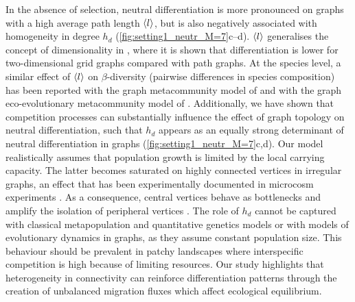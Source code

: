   In the absence of selection, neutral differentiation is more pronounced on graphs with a high average path length $\langle l \rangle$, but is also negatively associated with homogeneity in degree $h_d$ (\cref{fig:setting1_neutr_M=7}c--d).
  $\langle l \rangle$ generalises the concept of dimensionality in \cite{Kimura1964,Lande1991,Nagylaki1994}, where it is shown that differentiation is lower for two-dimensional grid graphs compared with path graphs. At the species level, a similar effect of $\langle l \rangle$ on $\beta$-diversity (pairwise differences in species composition) has been reported with the graph metacommunity model of \cite{Carrara2012} and with the graph eco-evolutionary metacommunity model of \cite{Economo2007}.
  Additionally, we have shown that competition processes can substantially influence the effect of graph topology on neutral differentiation, such that $h_d$ appears as an equally strong determinant of neutral differentiation in graphs (\cref{fig:setting1_neutr_M=7}c,d).
  Our model realistically assumes that population growth is limited by the local carrying capacity. The latter becomes saturated on highly connected vertices in irregular graphs, an effect that has been experimentally documented in microcosm experiments \cite{Altermatt2018}. As a consequence, central vertices behave as bottlenecks and amplify the isolation of peripheral vertices \cite{Orsini2013}.
  The role of $h_d$ cannot be captured with classical metapopulation and quantitative genetics models or with models of evolutionary dynamics in graphs, as they assume constant population size.
  This behaviour should be prevalent in patchy landscapes where interspecific competition is high because of limiting resources.
  Our study highlights that heterogeneity in connectivity can reinforce differentiation patterns through the creation of unbalanced migration fluxes which affect ecological equilibrium.
  
